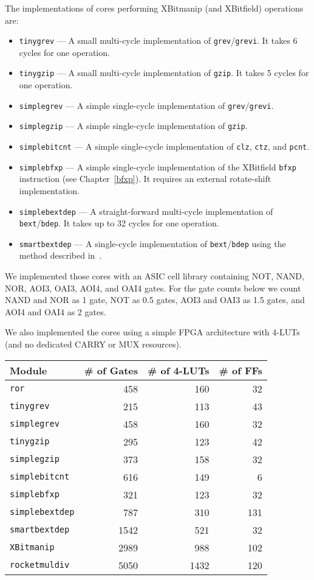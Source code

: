 The implementations of cores performing XBitmanip (and XBitfield) operations are:

\begin{itemize}
\item {\tt tinygrev} --- A small multi-cycle implementation of {\tt grev}/{\tt grevi}.
It takes 6 cycles for one operation.
\item {\tt tinygzip} --- A small multi-cycle implementation of {\tt gzip}.
It takes 5 cycles for one operation.
\item {\tt simplegrev} --- A simple single-cycle implementation of {\tt grev}/{\tt grevi}.
\item {\tt simplegzip} --- A simple single-cycle implementation of {\tt gzip}.
\item {\tt simplebitcnt} --- A simple single-cycle implementation of {\tt clz}, {\tt ctz}, and {\tt pcnt}.
\item {\tt simplebfxp} --- A simple single-cycle implementation of the XBitfield {\tt bfxp}
instruction (see Chapter~\ref{bfxp}). It requires an external rotate-shift implementation.
\item {\tt simplebextdep} --- A straight-forward multi-cycle implementation of {\tt bext}/{\tt bdep}.
It takes up to 32 cycles for one operation.
\item {\tt smartbextdep} --- A single-cycle implementation of {\tt bext}/{\tt bdep}
using the method described in~\cite{Hilewitz06}.
\end{itemize}

We implemented those cores with an ASIC cell library containing NOT, NAND, NOR,
AOI3, OAI3, AOI4, and OAI4 gates. For the gate counts below we count NAND and NOR
as 1 gate, NOT as 0.5 gates, AOI3 and OAI3 as 1.5 gates, and AOI4 and OAI4 as 2 gates.

We also implemented the cores using a simple FPGA architecture with 4-LUTs (and no
dedicated CARRY or MUX resources).

\begin{center}
\begin{tabular}{lrrr}
Module & \# of Gates & \# of 4-LUTs & \# of FFs \\
\hline
{\tt ror} & 458 & 160 & 32 \\
\hline
{\tt tinygrev} & 215 & 113 & 43 \\
{\tt simplegrev} & 458 & 160 & 32 \\
\hline
{\tt tinygzip} & 295 & 123 & 42 \\
{\tt simplegzip} & 373 & 158 & 32 \\
\hline
{\tt simplebitcnt} & 616 & 149 & 6 \\
{\tt simplebfxp} & 321 & 123 & 32 \\
\hline
{\tt simplebextdep} & 787 & 310 & 131 \\
{\tt smartbextdep} & 1542 & 521 & 32 \\
\hline
{\tt XBitmanip} & 2989 & 988 & 102 \\
{\tt rocketmuldiv} & 5050 & 1432 & 120 \\
\end{tabular}
\end{center}


